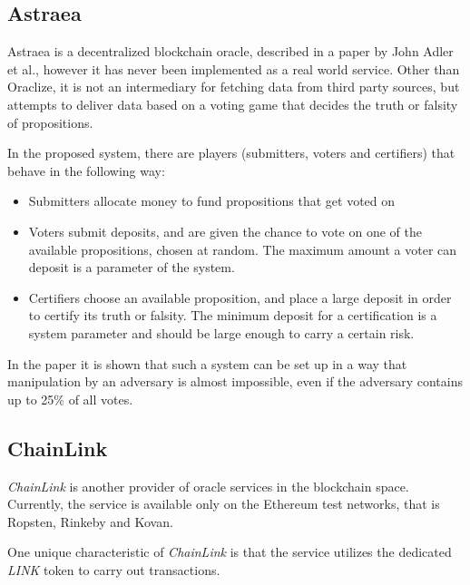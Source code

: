 \subsection{Astraea}
Astraea is a decentralized blockchain oracle, described in a paper by John Adler et al.\cite{astraea}, however it has never been implemented as a real world service. Other than Oraclize, it is not an intermediary for fetching data from third party sources, but attempts to deliver data based on a voting game that decides the truth or falsity of propositions.

In the proposed system, there are players (submitters, voters and certifiers) that behave in the following way:
\begin{itemize}
	\item Submitters allocate money to fund propositions that get voted on
	\item Voters submit deposits, and are given the chance to vote on one of the available propositions, chosen at random. The maximum amount a voter can deposit is a parameter of the system.
	\item Certifiers choose an available proposition, and place a large deposit in order to certify its truth or falsity. The minimum deposit for a certification is a system parameter and should be large enough to carry a certain risk.
\end{itemize}
In the paper it is shown that such a system can be set up in a way that manipulation by an adversary is almost impossible, even if the adversary contains up to 25\% of all votes\cite{astraea}.

\subsection{ChainLink}
\emph{ChainLink} is another provider of oracle services in the blockchain space. Currently, the service is available only on the Ethereum test networks, that is Ropsten, Rinkeby and Kovan.

One unique characteristic of \emph{ChainLink} is that the service utilizes the dedicated \emph{LINK} token to carry out transactions. 
